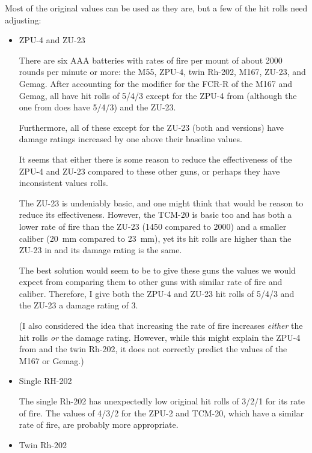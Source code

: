 {    Most of the original values can be used as they are, but a few of the hit rolls need adjusting:
    \begin{itemize}
        \item ZPU-4 and ZU-23

            There are six AAA batteries with rates of fire per mount of about 2000 rounds per minute or more: the M55, ZPU-4, twin Rh-202, M167, ZU-23, and Gemag. After accounting for the  modifier for the FCR-R of the M167 and Gemag, all have hit rolls of 5/4/3 except for the ZPU-4 from {\TSOH} (although the one from {\AirStr} does have 5/4/3) and the ZU-23.

            Furthermore, all of these except for the ZU-23 (both {\AirStr} and {\TSOH} versions) have damage ratings increased by one above their baseline values.

            It seems that either there is some reason to reduce the effectiveness of the ZPU-4 and ZU-23 compared to these other guns, or perhaps they have inconsistent values rolls.

            The ZU-23 is undeniably basic, and one might think that would be reason to reduce its effectiveness. However, the TCM-20 is basic too and has both a lower rate of fire than the ZU-23 (1450 compared to 2000) and a smaller caliber (20~mm compared to 23~mm), yet its hit rolls are higher than the ZU-23 in {\TSOH} and its damage rating is the same.

            The best solution would seem to be to give these guns the values we would expect from comparing them to other guns with similar rate of fire and caliber. Therefore, I give both the ZPU-4 and ZU-23 hit rolls of 5/4/3 and the ZU-23 a damage rating of 3.

            (I also considered the idea that increasing the rate of fire increases \emph{either} the hit rolls \emph{or} the damage rating. However, while this might explain the ZPU-4 from {\TSOH} and the twin Rh-202, it does not correctly predict the values of the M167 or Gemag.)

        \item Single RH-202

            The single Rh-202 has unexpectedly low original hit rolls of 3/2/1 for its rate of fire. The values of 4/3/2 for the ZPU-2 and TCM-20, which have a similar rate of fire, are probably more appropriate.

        \item Twin Rh-202


\end{itemize}}
